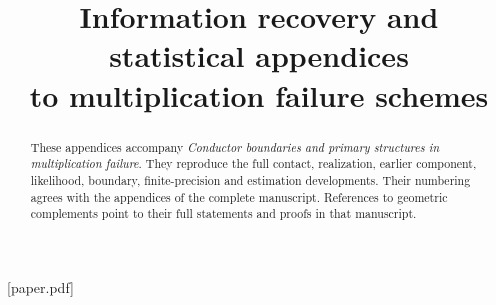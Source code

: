 
\title[Information recovery and statistical appendices]{Information recovery and statistical appendices\\to multiplication failure schemes}
[paper.pdf]

\begin{abstract}
These appendices accompany \emph{Conductor boundaries and primary
structures in multiplication failure}. They reproduce the full contact,
realization, earlier component, likelihood, boundary, finite-precision
and estimation developments. Their numbering agrees with the appendices
of the complete manuscript. References to geometric complements point
to their full statements and proofs in that manuscript.
\end{abstract}
\maketitle
\appendix









